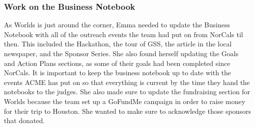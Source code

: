 \documentclass{article}
\begin{document}
\subsubsection{Work on the Business Notebook}
As Worlds is just around the corner, Emma needed to update the Business Notebook with all of the outreach events the team had put on from NorCals til then. This included the Hackathon, the tour of GSS, the article in the local newspaper, and the Sponsor Series. She also found herself updating the Goals and Action Plans sections, as some of their goals had been completed since NorCals. It is important to keep the business notebook up to date with the events ACME has put on so that everything is current by the time they hand the notebooks to the judges. She also made sure to update the fundraising section for Worlds because the team set up a GoFundMe campaign in order to raise money for their trip to Houston. She wanted to make sure to acknowledge those sponsors that donated. 
\end{document}
